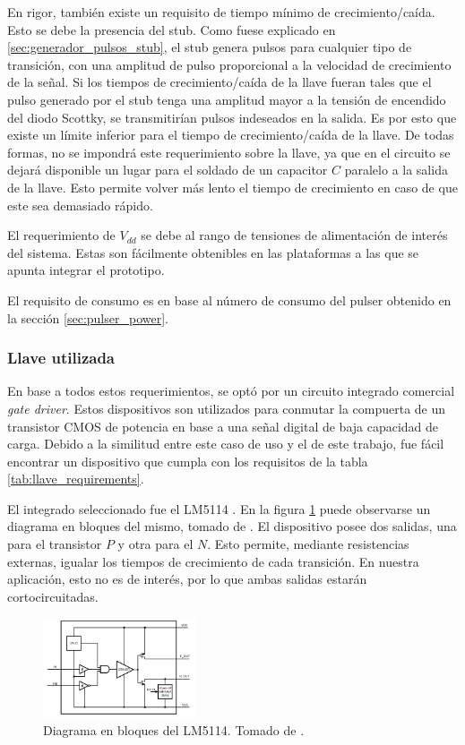 En rigor, también existe un requisito de tiempo mínimo de crecimiento/caída.
Esto se debe la presencia del stub. Como fuese explicado en
\ref{sec:generador_pulsos_stub}, el stub genera pulsos para cualquier tipo de
transición, con una amplitud de pulso proporcional a la velocidad de crecimiento
de la señal. Si los tiempos de crecimiento/caída de la llave fueran tales que el
pulso generado por el stub tenga una amplitud mayor a la tensión de encendido
del diodo Scottky, se transmitirían pulsos indeseados en la salida. Es por esto que
existe un límite inferior para el tiempo de crecimiento/caída de la llave. De
todas formas, no se impondrá  este requerimiento sobre la llave, ya que en el
circuito se dejará disponible un lugar para el soldado de un capacitor $C$
paralelo a la salida de la llave. Esto permite volver más lento el tiempo de
crecimiento en caso de que este sea demasiado rápido.

El requerimiento de $V_{dd}$ se debe al rango de tensiones de alimentación de
interés del sistema. Estas son fácilmente obtenibles en las plataformas a las
que se apunta integrar el prototipo.

El requisito de consumo es en base al número de consumo del pulser obtenido en
la sección \ref{sec:pulser_power}.

\subsubsection{Llave utilizada}

En base a todos estos requerimientos, se optó por un circuito integrado
comercial \textit{gate driver}. Estos dispositivos son utilizados para conmutar
la compuerta de un transistor CMOS de potencia en base a una señal digital de
baja capacidad de carga. Debido a la similitud entre este caso de uso y el de
este trabajo, fue fácil encontrar un dispositivo que cumpla con los requisitos
de la tabla \ref{tab:llave_requirements}.

El integrado seleccionado fue el LM5114 \cite{LM5114_datasheet}. En la figura
\ref{fig:lm5114_block_diagram} puede observarse un diagrama en bloques del
mismo, tomado de \cite{LM5114_datasheet}. El dispositivo posee dos salidas, una
para el transistor $P$ y otra para el $N$. Esto permite, mediante resistencias
externas, igualar los tiempos de crecimiento de cada transición. En nuestra
aplicación, esto no es de interés, por  lo que ambas salidas estarán
cortocircuitadas.

\begin{figure}[tbp]
    \centering
    \includegraphics[width=0.4\textwidth]{images/lm5114_block_diagram.png}
    \caption{Diagrama en bloques del LM5114. Tomado de \cite{LM5114_datasheet}.}
    \label{fig:lm5114_block_diagram}
\end{figure}

